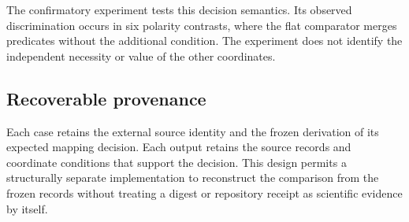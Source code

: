 The confirmatory experiment tests this decision semantics. Its observed
discrimination occurs in six polarity contrasts, where the flat comparator
merges predicates without the additional condition. The experiment does not
identify the independent necessity or value of the other coordinates.

\subsection{Recoverable provenance}

Each case retains the external source identity and the frozen derivation of its
expected mapping decision. Each output retains the source records and
coordinate conditions that support the decision. This design permits a
structurally separate implementation to reconstruct the comparison from the frozen records
without treating a digest or repository receipt as scientific evidence by
itself.
\endinput
